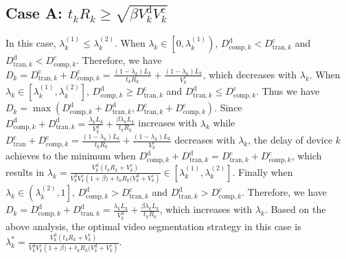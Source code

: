 \documentclass[journal,draftcls,onecolumn,12pt,twoside]{IEEEtran}
\begin{document}
\begin{appendices}
\subsection{Case A: $t_k R_k \ge \sqrt{\beta V_k^{\text{d}}V_k^{\text{c}}}$}
In this case, $\lambda_k^{(1)}\le\lambda_k^{(2)}$. When $\lambda_k\in \left[0,\lambda_k^{(1)}\right)$, $D_{{\text{comp},k}}^{\text{d}}< D_{{\text{tran},k}}^{\text{c}}$ and $D_{{\text{tran},k}}^{\text{d}}< D_{{\text{comp},k}}^{\text{c}}$. Therefore, we have $D_k=D_{{\text{tran},k}}^{\text{c}}+D_{{\text{comp},k}}^{\text{c}}=\frac{(1-\lambda_k)L_k}{t_k R_k}+\frac{(1-\lambda_k)L_k}{V_k^{\text{c}}}$, which decreases with $\lambda_k$. When $\lambda_k\in \left[\lambda_k^{(1)},\lambda_k^{(2)}\right]$, $D_{{\text{comp},k}}^{\text{d}} \ge D_{{\text{tran},k}}^{\text{c}}$ and $D_{{\text{tran},k}}^{\text{d}}\le D_{{\text{comp},k}}^{\text{c}}$. Thus we have $D_k = \max (D_{{\text{comp},k}}^{\text{d}}+D_{{\text{tran},k}}^{\text{d}}, D_{{\text{tran},k}}^{\text{c}}+D_{{\text{comp},k}}^{\text{c}})$. Since $D_{{\text{comp},k}}^{\text{d}}+D_{{\text{tran},k}}^{\text{d}}=\frac{\lambda_k L_k}{V_k^{\text{d}}}+\frac{\beta \lambda_k L_k}{t_k R_k}$ increases with $\lambda_k$ while $D_{{\text{tran}}}^{\text{c}}+D_{{\text{comp},k}}^{\text{c}}=\frac{(1-\lambda_k)L_k}{t_k R_k}+\frac{(1-\lambda_k)L_k}{V_k^{\text{c}}}$ decreases with $\lambda_k$, the delay of device $k$ achieves to the minimum when $D_{{\text{comp},k}}^{\text{d}}+D_{{\text{tran},k}}^{\text{d}}=D_{{\text{tran},k}}^{\text{c}}+D_{{\text{comp},k}}^{\text{c}}$, which results in $\lambda_k=\frac{V_k^{\text{d}}\left(t_kR_k+V_k^{\text{c}}\right)}{V_k^{\text{d}}V_k^{\text{c}}\left(1+\beta)+t_kR_k(V_k^{\text{d}}+V_k^{\text{c}}\right)}\in\left[\lambda_k^{(1)},\lambda_k^{(2)}\right]$. Finally when $\lambda_k\in \left(\lambda_k^{(2)},1\right]$, $D_{{\text{comp},k}}^{\text{d}} > D_{{\text{tran},k}}^{\text{c}}$ and $D_{{\text{tran},k}}^{\text{d}} > D_{{\text{comp},k}}^{\text{c}}$. Therefore, we have $D_k = D_{{\text{comp},k}}^{\text{d}}+D_{{\text{tran},k}}^{\text{d}}=\frac{\lambda_k L_k}{V_k^{\text{d}}}+\frac{\beta \lambda_k L_k}{t_k R_k}$, which increases with $\lambda_k$. Based on the above analysis, the optimal video segmentation strategy in this case is $\lambda_k^*=\frac{V_k^{\text{d}}\left(t_kR_k+V_k^{\text{c}}\right)}{V_k^{\text{d}}V_k^{\text{c}}\left(1+\beta)+t_kR_k(V_k^{\text{d}}+V_k^{\text{c}}\right)}$.

\end{appendices}
\end{document}
